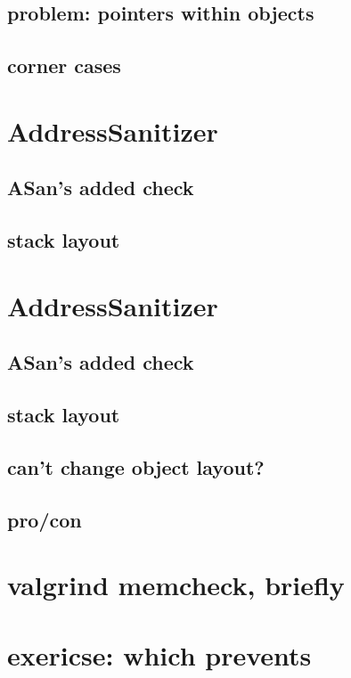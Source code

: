 \subsection{problem: pointers within objects}


\subsection{corner cases}


\section{AddressSanitizer}


\subsection{ASan's added check}


\subsection{stack layout}




\section{AddressSanitizer}


\subsection{ASan's added check}


\subsection{stack layout}


\subsection{can't change object layout?}


\subsection{pro/con}


\section{valgrind memcheck, briefly}


\section{exericse: which prevents}



